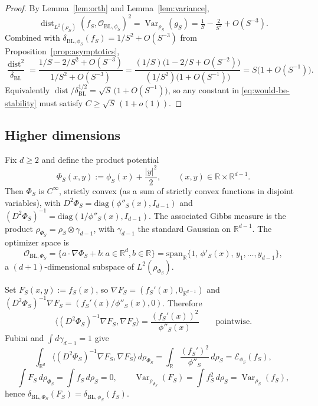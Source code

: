 \documentclass{article}
\theoremstyle{remark}
\DeclareMathOperator{\Var}{Var}
\DeclareMathOperator{\dist}{dist}
\begin{document}
\begin{proof}
By Lemma~\ref{lem:orth} and Lemma~\ref{lem:variance},
\[
  \dist_{L^2(\rho_S)}(f_S,\mathcal O_{\mathrm{BL},\phi_S})^2
  =\Var_{\rho_S}(g_S)
  =\tfrac{1}{S}-\tfrac{2}{S^2}+O(S^{-3}).
\]
Combined with $\delta_{\mathrm{BL},\phi_S}(f_S)=1/S^2+O(S^{-3})$ from
Proposition~\ref{prop:asymptotics},
\[
  \frac{\dist^2}{\delta_{\mathrm{BL}}}
  =\frac{1/S-2/S^2+O(S^{-3})}{1/S^2+O(S^{-3})}
  =\frac{(1/S)\bigl(1-2/S+O(S^{-2})\bigr)}
        {(1/S^2)\bigl(1+O(S^{-1})\bigr)}
  =S\bigl(1+O(S^{-1})\bigr).
\]
Equivalently $\dist/\delta_{\mathrm{BL}}^{1/2}=\sqrt S\,\bigl(1+O(S^{-1})\bigr)$,
so any constant in \eqref{eq:would-be-stability} must satisfy
$C\ge\sqrt S\,(1+o(1))$.
\end{proof}

\subsection*{Higher dimensions}

Fix $d\ge 2$ and define the product potential
\[
  \Phi_S(x,y):=\phi_S(x)+\frac{|y|^2}{2},
  \qquad (x,y)\in\mathbb R\times\mathbb R^{d-1}.
\]
Then $\Phi_S$ is $C^\infty$, strictly convex (as a sum of strictly convex
functions in disjoint variables), with
$D^2\Phi_S=\mathrm{diag}(\phi''_S(x),I_{d-1})$ and
$(D^2\Phi_S)^{-1}=\mathrm{diag}(1/\phi''_S(x),I_{d-1})$. The associated Gibbs
measure is the product
$\rho_{\Phi_S}=\rho_S\otimes\gamma_{d-1}$, with $\gamma_{d-1}$ the standard
Gaussian on $\mathbb R^{d-1}$. The optimizer space is
\[
  \mathcal O_{\mathrm{BL},\Phi_S}
  =\bigl\{a\cdot\nabla\Phi_S+b: a\in\mathbb R^d,b\in\mathbb R\bigr\}
  =\mathrm{span}_{\mathbb R}\bigl\{1,\,\phi'_S(x),\,y_1,\dots,y_{d-1}\bigr\},
\]
a $(d+1)$-dimensional subspace of $L^2(\rho_{\Phi_S})$.

Set $F_S(x,y):=f_S(x)$, so $\nabla F_S=(f_S'(x),0_{\mathbb R^{d-1}})$ and
$(D^2\Phi_S)^{-1}\nabla F_S=(f_S'(x)/\phi''_S(x),0)$. Therefore
\[
  \bigl\langle (D^2\Phi_S)^{-1}\nabla F_S,\nabla F_S\bigr\rangle
  =\frac{(f_S'(x))^2}{\phi''_S(x)}
  \qquad\text{pointwise}.
\]
Fubini and $\int d\gamma_{d-1}=1$ give
\[
  \int_{\mathbb R^d}\bigl\langle (D^2\Phi_S)^{-1}\nabla F_S,\nabla F_S\bigr\rangle
   \,d\rho_{\Phi_S}
  =\int_{\mathbb R}\frac{(f_S')^2}{\phi''_S}\,d\rho_S
  =\mathcal E_{\phi_S}(f_S),
\]
\[
  \int F_S\,d\rho_{\Phi_S}=\int f_S\,d\rho_S=0,\qquad
  \Var_{\rho_{\Phi_S}}(F_S)=\int f_S^2\,d\rho_S=\Var_{\rho_S}(f_S),
\]
hence
$\delta_{\mathrm{BL},\Phi_S}(F_S)=\delta_{\mathrm{BL},\phi_S}(f_S)$.
\end{document}
